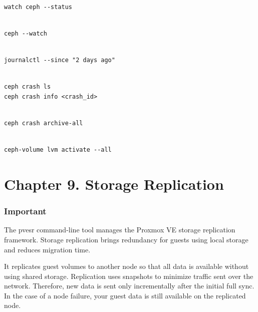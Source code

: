 \begin{lstlisting}

watch ceph --status

\end{lstlisting}

\begin{lstlisting}

ceph --watch

\end{lstlisting}

\begin{lstlisting}

journalctl --since "2 days ago"

\end{lstlisting}

\begin{lstlisting}

ceph crash ls
ceph crash info <crash_id>

\end{lstlisting}

\begin{lstlisting}

ceph crash archive-all

\end{lstlisting}

\begin{lstlisting}

ceph-volume lvm activate --all

\end{lstlisting}


\section{Chapter 9. Storage Replication}

\subsubsection{Important}

The pvesr command-line tool manages the Proxmox VE storage replication framework. Storage replication brings redundancy for guests using local storage and reduces migration time.

It replicates guest volumes to another node so that all data is available without using shared storage. Replication uses snapshots to minimize traffic sent over the network. Therefore, new data is sent only incrementally after the initial full sync. In the case of a node failure, your guest data is still available on the replicated node.

